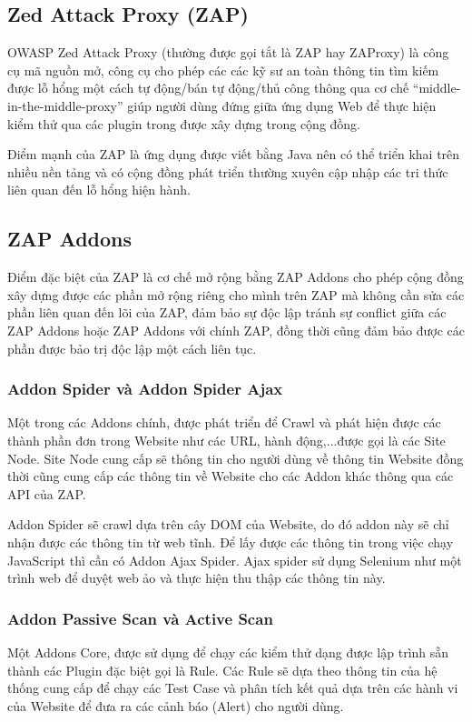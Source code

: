 \documentclass[./../main.tex]{subfiles}
\begin{document}
\subsection{Zed Attack Proxy (ZAP)}
OWASP Zed Attack Proxy (thường được gọi tắt là  ZAP hay ZAProxy) là công cụ mã nguồn mở, công cụ cho phép các các kỹ sư an toàn thông tin tìm kiếm được lỗ hổng một cách tự động/bán tự động/thủ công thông qua cơ chế “middle-in-the-middle-proxy” giúp người dùng đứng giữa ứng dụng Web để thực hiện kiểm thử qua các plugin trong được xây dựng trong cộng đồng.

Điểm mạnh của ZAP là ứng dụng được viết bằng Java nên có thể triển khai trên nhiều nền tảng và có cộng đồng phát triển thường xuyên cập nhập các tri thức liên quan đến lỗ hổng hiện hành.

\subsection{ZAP Addons}
Điểm đặc biệt của ZAP là cơ chế mở rộng bằng ZAP Addons cho phép cộng đồng xây dựng được các phần mở rộng riêng cho mình trên ZAP mà không cần sửa các phần liên quan đến lõi của ZAP, đảm bảo sự độc lập tránh sự conflict giữa các ZAP Addons hoặc ZAP Addons với chính ZAP, đồng thời cũng đảm bảo được các phần được bảo trị độc lập một cách liên tục.
\subsubsection{Addon Spider và Addon Spider Ajax}
Một trong các Addons chính, được phát triển để Crawl và phát hiện được các thành phần đơn trong Website như các URL, hành động,...được gọi là các Site Node. Site Node cung cấp sẽ thông tin cho người dùng về thông tin Website đồng thời cũng cung cấp các thông tin về Website cho các Addon khác thông qua các API của ZAP.

Addon Spider sẽ crawl dựa trên cây DOM của Website, do đó addon này sẽ chỉ nhận được các thông tin từ web tĩnh. Để lấy được các thông tin trong việc chạy JavaScript thì cần có Addon Ajax Spider. Ajax spider sử dụng Selenium như một trình web để duyệt web ảo và thực hiện thu thập các thông tin này.
\subsubsection{Addon Passive Scan và Active Scan}
Một Addons Core, được sử dụng để chạy các kiểm thử dạng được lập trình sẵn thành các Plugin đặc biệt gọi là Rule. Các Rule sẽ dựa theo thông tin của hệ thống cung cấp để chạy các Test Case và phân tích kết quả dựa trên các hành vi của Website để đưa ra các cảnh báo (Alert) cho người dùng.
\end{document}
